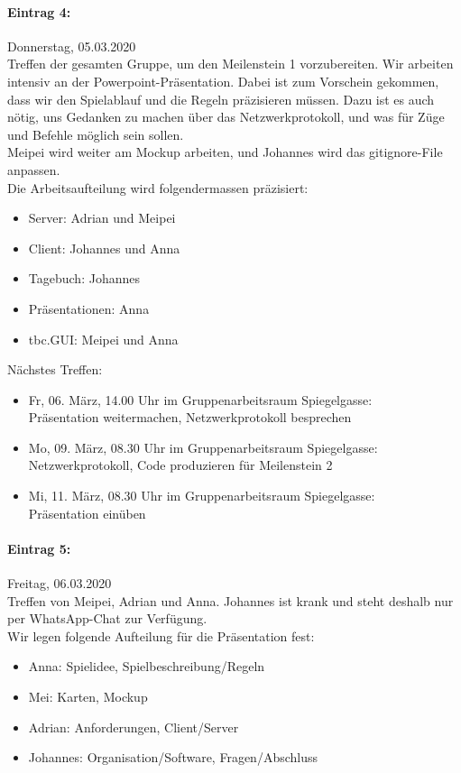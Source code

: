 \documentclass[12pt]{article}
\begin{document}
\paragraph{Eintrag 4:}
Donnerstag, 05.03.2020\\
Treffen der gesamten Gruppe, um den Meilenstein 1 vorzubereiten. Wir arbeiten intensiv an der Powerpoint-Pr\"asentation. Dabei ist zum Vorschein gekommen, dass wir den Spielablauf und die Regeln pr\"azisieren m\"ussen. Dazu ist es auch n\"otig, uns Gedanken zu machen \"uber das Netzwerkprotokoll, und was f\"ur Z\"uge und Befehle m\"oglich sein sollen.\\
Meipei wird weiter am Mockup arbeiten, und Johannes wird das gitignore-File anpassen.\\
Die Arbeitsaufteilung wird folgendermassen pr\"azisiert:
\begin{itemize}
\item Server: Adrian und Meipei
\item Client: Johannes und Anna
\item Tagebuch: Johannes
\item Pr\"asentationen: Anna
\item tbc.GUI: Meipei und Anna\\
\end{itemize}

\noindent N\"achstes Treffen:
\begin{itemize}
\item Fr, 06. M\"arz, 14.00 Uhr im Gruppenarbeitsraum Spiegelgasse:\\
Pr\"asentation weitermachen, Netzwerkprotokoll besprechen
\item Mo, 09. M\"arz, 08.30 Uhr im Gruppenarbeitsraum Spiegelgasse:\\
Netzwerkprotokoll, Code produzieren f\"ur Meilenstein 2
\item Mi, 11. M\"arz, 08.30 Uhr im Gruppenarbeitsraum Spiegelgasse:\\
Pr\"asentation ein\"uben
\end{itemize}

\paragraph{Eintrag 5:}
Freitag, 06.03.2020\\
Treffen von Meipei, Adrian und Anna. Johannes ist krank und steht deshalb nur per WhatsApp-Chat zur Verf\"ugung.\\
Wir legen folgende Aufteilung f\"ur die Pr\"asentation fest:
\begin{itemize}
\item Anna: Spielidee, Spielbeschreibung/Regeln
\item Mei: Karten, Mockup
\item Adrian: Anforderungen, Client/Server
\item Johannes: Organisation/Software, Fragen/Abschluss
\end{itemize}
\end{document}
